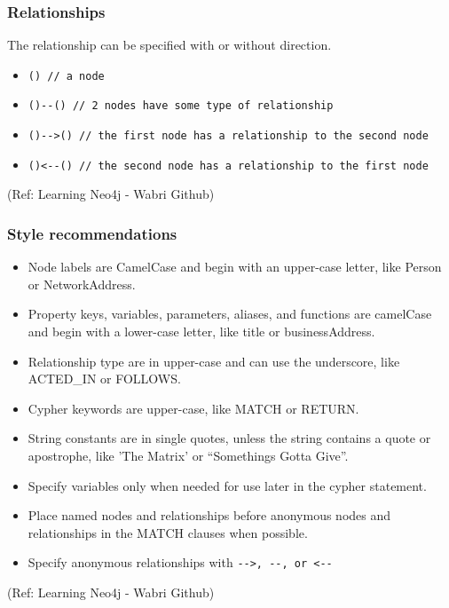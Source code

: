 \begin{frame}\frametitle{Relationships}

The relationship can be specified with or without direction.

\begin{itemize}
\item \lstinline|() // a node|
\item \lstinline|()--() // 2 nodes have some type of relationship|
\item \lstinline|()-->() // the first node has a relationship to the second node|
\item \lstinline|()<--() // the second node has a relationship to the first node |
\end{itemize}

{\tiny (Ref: Learning Neo4j - Wabri Github)}
\end{frame}

\begin{frame}\frametitle{Style recommendations}

\begin{itemize}
\item Node labels are CamelCase and begin with an upper-case letter, like Person or NetworkAddress.
\item Property keys, variables, parameters, aliases, and functions are camelCase and begin with a lower-case letter, like title or businessAddress.
\item Relationship type are in upper-case and can use the underscore, like ACTED\_IN or FOLLOWS.
\item Cypher keywords are upper-case, like MATCH or RETURN.
\item String constants are in single quotes, unless the string contains a quote or apostrophe, like 'The Matrix' or ``Somethings Gotta Give''.
\item Specify variables only when needed for use later in the cypher statement.
\item Place named nodes and relationships before anonymous nodes and relationships in the MATCH clauses when possible.
\item Specify anonymous relationships with \lstinline|-->, --, or <--|
\end{itemize}

{\tiny (Ref: Learning Neo4j - Wabri Github)}
\end{frame}

